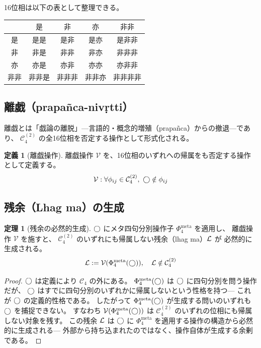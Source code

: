 \documentclass[11pt,a4paper]{article}
\theoremstyle{definition}
\newtheorem{definition}{定義}[section]
\newtheorem{theorem}{定理}[section]
\newcommand{\phiS}{\text{是}}
\newcommand{\phiN}{\text{非}}
\newcommand{\phiSN}{\text{亦}}
\newcommand{\phiNS}{\text{非非}}
\newcommand{\Phimeta}{\Phi_{4}^{\mathrm{meta}}}
\begin{document}
16位相は以下の表として整理できる。

\begin{center}
\begin{tabular}{c|cccc}
& $\phiS$ & $\phiN$ & $\phiSN$ & $\phiNS$ \\
\hline
$\phiS$ & 是是 & 是非 & 是亦 & 是非非 \\
$\phiN$ & 非是 & 非非 & 非亦 & 非非非 \\
$\phiSN$ & 亦是 & 亦非 & 亦亦 & 亦非非 \\
$\phiNS$ & 非非是 & 非非非 & 非非亦 & 非非非非 \\
\end{tabular}
\end{center}

\subsection{離戯（prapañca-nivṛtti）}

離戯とは「戯論の離脱」---言語的・概念的増殖（prapañca）からの撤退---であり、
$\mathcal{C}_4^{(2)}$ の全16位相を否定する操作として形式化される。

\begin{definition}[離戯操作]
離戯操作 $\mathcal{V}$ を、16位相のいずれへの帰属をも否定する操作として定義する。
\begin{equation}
\mathcal{V} : \forall \phi_{ij} \in \mathcal{C}_4^{(2)},\ 
\dfix \notin \phi_{ij}
\end{equation}
\end{definition}

\subsection{残余（Lhag ma）の生成}

\begin{theorem}[残余の必然的生成]
$\bigcirc$ にメタ四句分別操作子 $\Phimeta$ を適用し、
離戯操作 $\mathcal{V}$ を施すと、
$\mathcal{C}_4^{(2)}$ のいずれにも帰属しない残余（lhag ma）$\mathcal{L}$ が
必然的に生成される。
\begin{equation}
\Lhagma := \mathcal{V}(\Phimeta(\dfix)),\quad
\Lhagma \notin \mathcal{C}_4^{(2)}
\end{equation}
\end{theorem}

\begin{proof}
$\bigcirc$ は定義により $\mathcal{C}_4$ の外にある。
$\Phimeta(\dfix)$ は $\bigcirc$ に四句分別を問う操作だが、
$\bigcirc$ はすでに四句分別のいずれかに帰属しないという性格を持つ---
これが $\bigcirc$ の定義的性格である。
したがって $\Phimeta(\dfix)$ が生成する問いのいずれも
$\bigcirc$ を捕捉できない。
すなわち $\mathcal{V}(\Phimeta(\dfix))$ は
$\mathcal{C}_4^{(2)}$ のいずれの位相にも帰属しない対象を残す。
この残余 $\mathcal{L}$ は
$\bigcirc$ に $\Phimeta$ を適用する操作の構造から必然的に生成される---
外部から持ち込まれたのではなく、操作自体が生成する余剰である。
\end{proof}
\end{document}
